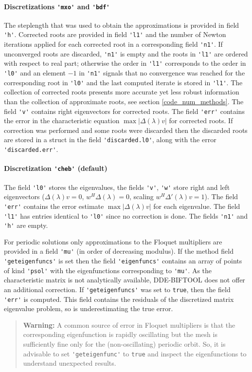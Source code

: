 \documentclass[10pt]{scrartcl}
\newcommand{\DDEBIFCODE}{\textsc{DDE-BIFTOOL}}
\newcommand{\blist}[1]{\mbox{\lstinline!#1!}}
\begin{document}
\paragraph{Discretizations \blist{'mxo'} and \blist{'bdf'}}
The steplength that was used to obtain the approximations is provided
in field \blist{'h'}. Corrected roots are provided in field
\blist{'l1'} and the number of Newton iterations applied for each
corrected root in a corresponding field \blist{'n1'}.  If unconverged
roots are discarded, \blist{'n1'} is empty and the roots in
\blist{'l1'} are ordered with respect to real part; otherwise the
order in \blist{'l1'} corresponds to the order in \blist{'l0'} and an
element $-1$ in \blist{'n1'} signals that no convergence was reached
for the corresponding root in \blist{'l0'} and the last computed
iterate is stored in \blist{'l1'}.  The collection of corrected roots
presents more accurate yet less robust information than the collection
of approximate roots, see section \ref{code_num_methods}. The field
\blist{'v'} contains right eigenvectors for corrected roots. The field
\blist{'err'} contains the error in the characteristic equation
$\max|\Delta(\lambda)v|$ for corrected roots. If correction was performed
and some roots were discarded then the discarded roots are stored in a
struct in the field \blist{'discarded.l0'}, along with the error \blist{'discarded.err'}.

\paragraph{Discretization \blist{'cheb'} (default)}
The field \blist{'l0'} stores the eigenvalues, the fields \blist{'v'},
\blist{'w'} store right and left eigenvectors ($\Delta(\lambda)v=0$,
$w^H\Delta(\lambda)=0$, scaling $w^H\Delta'(\lambda)v=1$). The field
\blist{'err'} contains the error estimate $\max|\Delta(\lambda)v|$ for
each eigenvalue. The field \blist{'l1'} has entries identical to
\blist{'l0'} since no correction is done. The fields \blist{'n1'} and
\blist{'h'} are empty.

For periodic solutions only approximations to the Floquet multipliers
are provided in a field \blist{'mu'} (in order of decreasing
modulus). If the method field \blist{'geteigenfuncs'} is set then the
field \blist{'eigenfuncs'} contains an array of points of kind
\blist{'psol'} with the eigenfunctions corresponding to
\blist{'mu'}. As the characteristic matrix is not analytically
available, \DDEBIFCODE{} does not offer an additional correction. If
\blist{'geteigenfuncs'} was set to \blist{true}, then the field
\blist{'err'} is computed. This field contains the residuals of the
discretized matrix eigenvalue problem, so is underestimating the true
error.
\begin{quote}
  \textbf{Warning:} A common source of error in Floquet multipliers is
  that the corresponding eigenfunction is rapidly oscillating but the
  mesh is sufficiently fine only for the (non-oscillating) periodic
  orbit. So, it is advisable to set \blist{'geteigenfunc'} to
  \blist{true} and inspect the eigenfunctions to understand unexpected
  results.
\end{quote}
\end{document}
